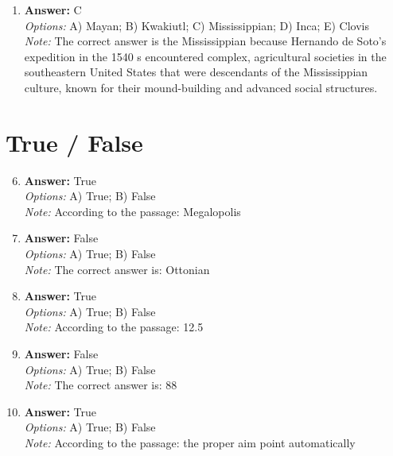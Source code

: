 \documentclass[12pt]{article}
\begin{document}
\begin{enumerate}[label=\arabic*.]
\\ \textit{Note:} Research indicates that the evolution of the C$_{4}$ photosynthetic pathway in grasses allowed for more efficient growth in warmer, drier climates, leading ancient hominids to shift their diets from the more easily gathered nuts and fruits to a greater reliance on grass-based resources, which were becoming more abundant.
\item \textbf{Answer:} C
\\ \textit{Options:} A) Mayan; B) Kwakiutl; C) Mississippian; D) Inca; E) Clovis
\\ \textit{Note:} The correct answer is the Mississippian because Hernando de Soto's expedition in the 1540 s encountered complex, agricultural societies in the southeastern United States that were descendants of the Mississippian culture, known for their mound-building and advanced social structures.
\end{enumerate}

\section*{True / False}
\begin{enumerate}[label=\arabic*.]
\setcounter{enumi}{5}
\item \textbf{Answer:} True
\\ \textit{Options:} A) True; B) False
\\ \textit{Note:} According to the passage: Megalopolis
\item \textbf{Answer:} False
\\ \textit{Options:} A) True; B) False
\\ \textit{Note:} The correct answer is: Ottonian
\item \textbf{Answer:} True
\\ \textit{Options:} A) True; B) False
\\ \textit{Note:} According to the passage: 12.5
\item \textbf{Answer:} False
\\ \textit{Options:} A) True; B) False
\\ \textit{Note:} The correct answer is: 88
\item \textbf{Answer:} True
\\ \textit{Options:} A) True; B) False
\\ \textit{Note:} According to the passage: the proper aim point automatically
\end{enumerate}
\end{document}
